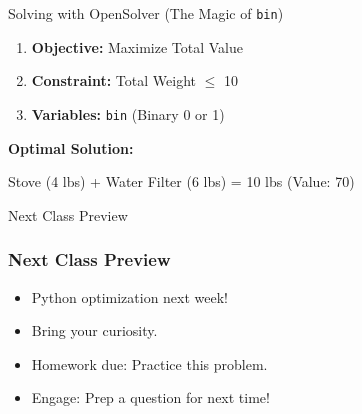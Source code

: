\documentclass{beamer}
\begin{document}
\begin{frame}{Solving with OpenSolver (The Magic of \texttt{bin})}
  \Large
  \begin{enumerate}
    \item \textbf{Objective:} Maximize Total Value
    \vspace{0.5cm}
    \item \textbf{Constraint:} Total Weight $\le$ 10
    \vspace{0.5cm}
    \item \textbf{Variables:} \texttt{bin} (Binary 0 or 1)
  \end{enumerate}
  
  \vspace{1cm}
  \normalsize
  \centering
  \textbf{Optimal Solution:}
  
  Stove (4 lbs) + Water Filter (6 lbs) = 10 lbs (Value: 70)
\end{frame}


\begin{frame}{Next Class Preview}
\frametitle{Next Class Preview}
\begin{itemize}
  \item Python optimization next week!
  \item Bring your curiosity.
  \item Homework due: Practice this problem.
  \item Engage: Prep a question for next time!
\end{itemize}
\end{frame}
\end{document}
